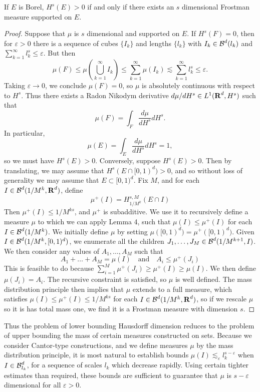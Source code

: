 \begin{lemma}
	If $E$ is Borel, $H^s(E) > 0$ if and only if there exists an $s$ dimensional Frostman measure supported on $E$.
\end{lemma}
\begin{proof}
	Suppose that $\mu$ is $s$ dimensional and supported on $E$. If $H^s(F) = 0$, then for $\varepsilon > 0$ there is a sequence of cubes $\{ I_k \}$ and lengths $\{ l_k \}$ with $I_k \in \operatorname{\mathcal{B}}^d(l_k)$ and $\sum_{k = 1}^\infty l_k^s \leq \varepsilon$. But then
	\[ \mu(F) \leq \mu \left( \bigcup_{k = 1}^\infty I_k \right) \leq \sum_{k = 1}^\infty \mu(I_k) \lesssim \sum_{k = 1}^\infty l_k^s \leq \varepsilon. \]
	Taking $\varepsilon \to 0$, we conclude $\mu(F) = 0$, so $\mu$ is absolutely continuous with respect to $H^s$. Thus there exists a Radon Nikodym derivative $d\mu/dH^s \in L^1(\operatorname{\mathbf{R}}^d,H^s)$ such that
	\[ \mu(F) = \int_F \frac{d\mu}{dH^s} dH^s. \]
	In particular,
	\[ \mu(E) = \int_E \frac{d\mu}{dH^s} dH^s = 1, \]
	so we must have $H^s(E) > 0$. Conversely, suppose $H^s(E) > 0$. Then by translating, we may assume that $H^s(E \cap [0,1)^d) > 0$, and so without loss of generality we may assume that $E \subset [0,1)^d$. Fix $M$, and for each $I \in \operatorname{\mathcal{B}}^d(1/M^k,\operatorname{\mathbf{R}}^d)$, define
	\[ \mu^+(I) = H^{s,M}_{1/M^k}(E \cap I) \]
	Then $\mu^+(I) \leq 1/M^{ks}$, and $\mu^+$ is subadditive. We use it to recursively define a measure $\mu$ to which we can apply Lemma 4, such that $\mu(I) \leq \mu^+(I)$ for each $I \in \operatorname{\mathcal{B}}^d(1/M^k)$. We initially define $\mu$ by setting $\mu([0,1)^d) = \mu^+([0,1)^d)$. Given $I \in \operatorname{\mathcal{B}}^d(1/M^k,[0,1)^d)$, we enumerate all the children $J_1, \dots, J_M \in \operatorname{\mathcal{B}}^d(1/M^{k+1},I)$. We then consider any values of $A_1, \dots, A_M$ such that
	\[ A_1 + \dots + A_M = \mu(I)\quad\text{and}\quad A_i \leq \mu^+(J_i) \]
	This is feasible to do because $\sum_{i = 1}^M \mu^+(J_i) \geq \mu^+(I) \geq \mu(I)$. We then define $\mu(J_i) = A_i$. The recursive constraint is satisfied, so $\mu$ is well defined. The mass distribution principle then implies that $\mu$ extends to a full measure, which satisfies $\mu(I) \leq \mu^+(I) \leq 1/M^{ks}$ for each $I \in \operatorname{\mathcal{B}}^d(1/M^k,\operatorname{\mathbf{R}}^d)$, so if we rescale $\mu$ so it is has total mass one, we find it is a Frostman measure with dimension $s$.
\end{proof}

Thus the problem of lower bounding Hausdorff dimension reduces to the problem of upper bounding the mass of certain measures constructed on sets. Because we consider Cantor-type constructions, and we define measures $\mu$ by the mass distribution principle, it is most natural to establish bounds $\mu(I) \lesssim_\varepsilon l_k^{s - \varepsilon}$ when $I \in \operatorname{\mathcal{B}}^d_{l_k}$, for a sequence of scales $l_k$ which decrease rapidly. Using certain tighter estimates than required, these bounds are sufficient to guarantee that $\mu$ is $s - \varepsilon$ dimensional for all $\varepsilon > 0$.

